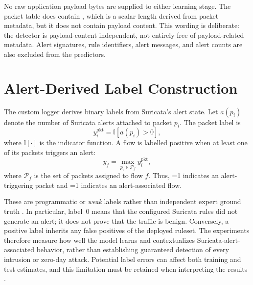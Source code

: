 \documentclass[11pt,fleqn]{report}
\begin{document}
No raw application payload bytes are supplied to either learning stage. The
packet table does contain , which is a scalar length
derived from packet metadata, but it does not contain payload content. This
wording is deliberate: the detector is payload-content independent, not
entirely free of payload-related metadata. Alert signatures, rule identifiers,
alert messages, and alert counts are also excluded from the predictors.

\section{Alert-Derived Label Construction}
\label{subsec:label_construction}

The custom logger derives binary labels from Suricata's alert state. Let
$a(p_i)$ denote the number of Suricata alerts attached to packet $p_i$. The
packet label is
\begin{equation}
    y_i^{\mathrm{pkt}}
    = \mathbb{I}\!\left[a(p_i)>0\right],
    \label{eq:packet_alert_label}
\end{equation}
where $\mathbb{I}[\cdot]$ is the indicator function. A flow is labelled
positive when at least one of its packets triggers an alert:
\begin{equation}
    y_f
    = \max_{p_i\in\mathcal{P}_f} y_i^{\mathrm{pkt}},
    \label{eq:flow_alert_label}
\end{equation}
where $\mathcal{P}_f$ is the set of packets assigned to flow $f$. Thus,
=1 indicates an alert-triggering packet and
=1 indicates an alert-associated flow.

These are programmatic or \emph{weak} labels rather than independent expert
ground truth \cite{Ratner2017Snorkel}. In particular, label~0 means that the
configured Suricata rules did not generate an alert; it does not prove that the
traffic is benign. Conversely, a positive label inherits any false positives
of the deployed ruleset. The experiments therefore measure how well the model
learns and contextualizes Suricata-alert-associated behavior, rather than
establishing guaranteed detection of every intrusion or zero-day attack.
Potential label errors can affect both training and test estimates, and this
limitation must be retained when interpreting the results
\cite{Northcutt2021ConfidentLearning}.

\end{document}

